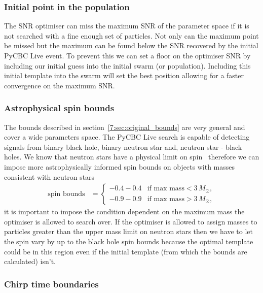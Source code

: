 \subsubsection{Initial point in the population}

The SNR optimiser can miss the maximum SNR of the parameter space if it is not searched with a fine enough set of particles. Not only can the maximum point be missed but the maximum can be found below the SNR recovered by the initial PyCBC Live event. To prevent this we can set a floor on the optimiser SNR by including our initial guess into the initial swarm (or population). Including this initial template into the swarm will set the best position allowing for a faster convergence on the maximum SNR.

\subsubsection{Astrophysical spin bounds}

The bounds described in section~\ref{7:sec:original_bounds} are very general and cover a wide parameters space. The PyCBC Live search is capable of detecting \gwadj signals from binary black hole, binary neutron star and, neutron star - black holes. We know that neutron stars have a physical limit on spin~\cite{Harry_Lundgren:2012} therefore we can impose more astrophysically informed spin bounds on objects with masses consistent with neutron stars
%
\begin{align}
    \text{spin bounds} &= 
    \begin{cases} 
        -0.4 - 0.4 & \text{if } \text{max mass} < 3 \, M_{\odot}, \\
        -0.9 - 0.9 & \text{if } \text{max mass} > 3 \, M_{\odot},
    \end{cases} 
\end{align}
%
it is important to impose the condition dependent on the maximum mass the optimiser is allowed to search over. If the optimiser is allowed to assign masses to particles greater than the upper mass limit on neutron stars then we have to let the spin vary by up to the black hole spin bounds because the optimal template could be in this region even if the initial template (from which the bounds are calculated) isn't.

\subsubsection{Chirp time boundaries}

